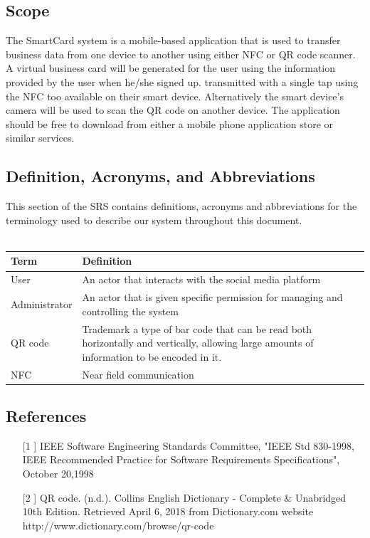 \documentclass[english]{article}
\begin{document}
		\subsection{Scope}
The SmartCard system is a mobile-based application that is used to transfer business data from one device to another using either NFC or QR code scanner. A virtual business card will be generated for the user using the information provided by the user when he/she signed up. transmitted with a single tap using the NFC too available on their smart device. Alternatively the smart device’s camera will be used to scan the QR code on another device. The application should be free to download from either a mobile phone application store or similar services. 


		\subsection{Definition, Acronyms, and Abbreviations}
				This section of the SRS contains definitions, acronyms and abbreviations for the terminology used to describe our system throughout this document.
				\\
				\\
				\begin{tabular}{ |p{3cm}|p{9cm}|  }
				\hline
				\textbf{Term} & \textbf{Definition}\\
				\hline
				User & An actor that interacts with the social media platform\\
				\hline
				Administrator & An actor that is given specific permission for managing and controlling the system\\
				\hline
				QR code & Trademark a type of bar code that can be read both horizontally and vertically, allowing large amounts of information to be encoded in it.\\
				\hline
				NFC & Near field communication \\
				\hline
				\end{tabular}


		\subsection{References}
\begin{itemize}
			\item [[1]] IEEE Software Engineering Standards Committee, "IEEE Std 830-1998, IEEE Recommended Practice for Software Requirements Specifications", October 20,1998 \\
			\item [[2]] QR code. (n.d.). Collins English Dictionary - Complete \& Unabridged 10th Edition. Retrieved April 6, 2018 from Dictionary.com website http://www.dictionary.com/browse/qr-code
		
		\end{itemize}
\end{document}
